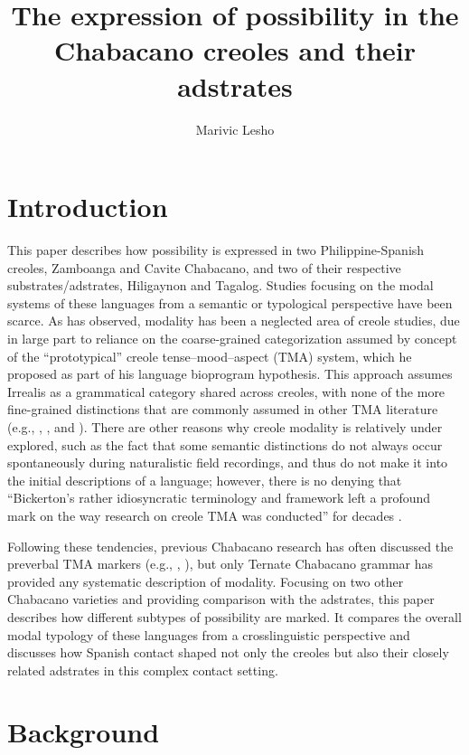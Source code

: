 \documentclass[output=paper,colorlinks,citecolor=brown]{langscibook}
\author{Marivic Lesho\affiliation{Franklin University}}
\title[Possibility in the Chabacano creoles]{The expression of possibility in the Chabacano creoles and their adstrates}
\begin{document}
\maketitle 


\section{Introduction}

This paper describes how possibility is expressed in two Philippine-Spanish creoles, Zamboanga and Cavite Chabacano, and two of their respective substrates\slash adstrates, Hiligaynon and Tagalog. Studies focusing on the modal systems of these languages from a semantic or typological perspective have been scarce. As \citet{Winford2000_irrealis, Winford2018} has observed, modality has been a neglected area of creole studies, due in large part to reliance on the coarse-grained categorization assumed by  concept of the “prototypical” creole tense–mood–aspect (TMA) system, which he proposed as part of his language bioprogram hypothesis. This approach assumes Irrealis as a grammatical category shared across creoles, with none of the more fine-grained distinctions that are commonly assumed in other TMA literature (e.g., \citealt{Dahl1985}, \citealt{BybeePagliuca1994}, and \citealt{Palmer2001}). There are other reasons why creole modality is relatively under explored, such as the fact that some semantic distinctions do not always occur spontaneously during naturalistic field recordings, and thus do not make it into the initial descriptions of a language; however, there is no denying that “Bickerton’s rather idiosyncratic terminology and framework left a profound mark on the way research on creole TMA was conducted” for decades \citep[1]{Winford2018}. 

Following these tendencies, previous Chabacano research has often discussed the preverbal TMA markers (e.g., \citealt{Forman1972}, \citealt{LipskiSantoro2007}), but only  Ternate Chabacano grammar has provided any systematic description of modality. Focusing on two other Chabacano varieties and providing comparison with the adstrates, this paper describes how different subtypes of possibility are marked. It compares the overall modal typology of these languages from a crosslinguistic perspective and discusses how Spanish contact shaped not only the creoles but also their closely related adstrates in this complex contact setting. 

\section{Background}
\end{document}
